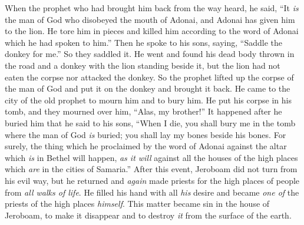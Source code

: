 \begin{biblechapter}
\verse When the prophet who had brought him back from the way heard, he said, “It \textit{is} the man of God who disobeyed the mouth of Adonai, and Adonai has given him to the lion. He tore him in pieces and killed him according to the word of Adonai which he had spoken to him.”
\verse Then he spoke to his sons, saying, “Saddle the donkey for me.” So they saddled it.
\verse He went and found his dead body thrown in the road and a donkey with the lion standing beside it, but the lion had not eaten the corpse nor attacked the donkey.
\verse So the prophet lifted up the corpse of the man of God and put it on the donkey and brought it back. He came to the city of the old prophet to mourn him and to bury him.
\verse He put his corpse in his tomb, and they mourned over him, “Alas, my brother!”
\verse It happened after he buried him that he said to his sons, “When I die, you shall bury me in the tomb where the man of God \textit{is} buried; you shall lay my bones beside his bones.
\verse For surely, the thing which he proclaimed by the word of Adonai against the altar which \textit{is} in Bethel will happen, \textit{as it will} against all the houses of the high places which \textit{are} in the cities of Samaria.”
 After this event, Jeroboam did not turn from his evil way, but he returned and \textit{again} made priests for the high places of people from \textit{all walks of life}. He filled his hand with all \textit{his} desire and became \textit{one of} the priests of the high places \textit{himself}.
\verse This matter became sin in the house of Jeroboam, to make it disappear and to destroy \textit{it} from the surface of the earth.
\end{biblechapter}

